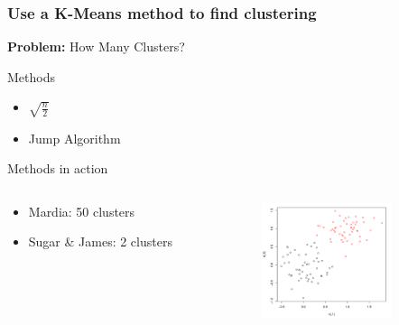\documentclass[serif]{beamer}
\begin{document}
	\begin{frame}[t]
		\frametitle{Use a K-Means method to find clustering}
		
		{\huge \textbf{Problem:} How Many Clusters?}
		
		\begin{block}{Methods}
			\begin{itemize}
				\item  $\sqrt{\frac{n}{2}}$ \cite{Mardia}
				\item  Jump Algorithm \cite{SugarJames}
			\end{itemize}
		\end{block}
		
		\begin{block}{Methods in action}
			\begin{columns}
				\begin{column}{2in}
					\begin{itemize}
						\item  Mardia: 50 clusters
						\item  Sugar \& James: 2 clusters
					\end{itemize}
				\end{column}
				\begin{column}{2in}
					\includegraphics[width=1.5in]{images/JUMP/clustering_example}
				\end{column}
			\end{columns}
		\end{block}
		
	\end{frame}
	
\end{document}
